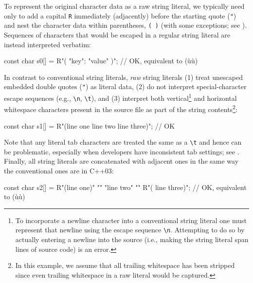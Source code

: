 \noindent To represent the original character
data as a raw string literal, we typically need only to add a capital \lstinline!R! immediately
(adjacently) before the starting quote (\lstinline!"!) and nest the
character data within parentheses, \lstinline!(!~\lstinline!)! (with some exceptions; see ).  
Sequences of
characters that would be escaped in a regular string literal are instead
interpreted verbatim:

\begin{emcppslisting}
const char s0[] = R"({ "key": "value" })";
    // OK, equivalent to (ù{}ù)
\end{emcppslisting}
    
\noindent In contrast to conventional string literals, \emph{raw} string literals
(1) treat unescaped embedded double quotes (\lstinline!"!) as literal data,
(2) do not interpret special-character escape sequences (e.g.,
\lstinline!\n!, \lstinline!\t!), and (3) interpret both vertical{\cprotect\footnote{To incorporate a newline character into a conventional string literal one must represent that newline using the escape sequence \lstinline!\n!.  Attempting to do so by actually entering a newline into the source (i.e., making the string literal span lines of source code) is an error.}} and horizontal 
whitespace characters present in
the source file as part of the string contents{\cprotect\footnote{In
this example, we assume that all trailing whitespace has been stripped
since even trailing whitespace in a raw literal would be captured.}}:


\begin{emcppslisting}
const char s1[] = R"(line one
line two
    line three)";
    // OK
\end{emcppslisting}
    
\noindent Note that any literal tab characters are treated the same as a
\lstinline!\t! and hence can be problematic, especially when
developers have inconsistent tab settings; see .  
Finally, all string literals are concatenated with
adjacent ones in the same way the conventional ones are in C++03:

\begin{emcppslisting}
const char s2[] = R"(line one)"         "\n"
                    "line two"          "\n"
                  R"(    line three)";
    // OK, equivalent to (ù{}ù)    
\end{emcppslisting}

